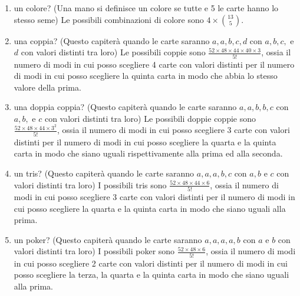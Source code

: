 \begin{enumerate}
    \begin{enumerate}
        \item un colore? (Una mano si definisce un colore se tutte e 5 le carte hanno lo stesso seme) Le possibili combinazioni di colore sono $4 \times \binom{13}{5}$.
        \item una coppia? (Questo capiter\`a quando le carte saranno $a, a, b, c, d$ con $a, b, c,$ e $d$ con valori distinti tra loro) Le possibili coppie sono $\frac{52 \times 48 \times 44 \times 40 \times 3}{5!}$, ossia il numero di modi in cui posso scegliere 4 carte con valori distinti per il numero di modi in cui posso scegliere la quinta carta in modo che abbia lo stesso valore della prima.
        \item una doppia coppia? (Questo capiter\`a quando le carte saranno $a, a, b, b, c$ con $a, b,$ e $c$ con valori distinti tra loro) Le possibili doppie coppie sono $\frac{52 \times 48 \times 44 \times 3^2}{5!} $, ossia il numero di modi in cui posso scegliere 3 carte con valori distinti per il numero di modi in cui posso scegliere la quarta e la quinta carta in modo che siano uguali rispettivamente alla prima ed alla seconda.
        \item un tris? (Questo capiter\`a quando le carte saranno $a, a, a, b, c$ con $a, b$ e $c$ con valori distinti tra loro)  I possibili tris sono $\frac{52 \times 48 \times 44 \times 6}{5!}$, ossia il numero di modi in cui posso scegliere 3 carte con valori distinti per il numero di modi in cui posso scegliere la quarta e la quinta carta in modo che siano uguali alla prima.
        \item un poker? (Questo capiter\`a quando le carte saranno $a, a, a, a, b$ con $a$ e $b$ con valori distinti tra loro) I possibili poker sono $\frac{52 \times 48 \times 6}{5!}$, ossia il numero di modi in cui posso scegliere 2 carte con valori distinti per il numero di modi in cui posso scegliere la terza, la quarta e la quinta carta in modo che siano uguali  alla prima.
    \end{enumerate}
\end{enumerate}